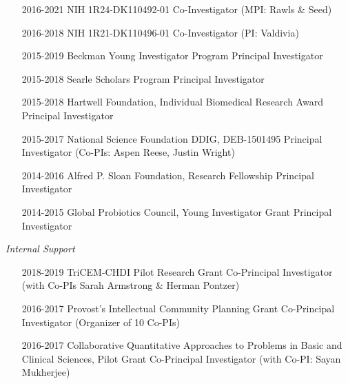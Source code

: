 \documentclass[overlapped,line,11pt]{res}
\begin{document}
\begin{resume}
\begin{itemize}[leftmargin=2cm, style=sameline]
\item[2016-2021] NIH 1R24-DK110492-01  \newline
  Co-Investigator (MPI: Rawls \& Seed)

\item[2016-2018] NIH 1R21-DK110496-01 \newline Co-Investigator (PI: Valdivia)

\item[2015-2019] Beckman Young Investigator Program
   \newline Principal Investigator

\item[2015-2018] Searle Scholars Program  \newline Principal Investigator 
  
\item[2015-2018] Hartwell Foundation, Individual Biomedical Research Award \newline Principal Investigator 


\item[2015-2017] National Science Foundation DDIG, DEB-1501495 \newline Principal Investigator (Co-PIs: Aspen Reese, Justin Wright) 


\item[2014-2016] Alfred P. Sloan Foundation, Research Fellowship \newline Principal Investigator 

\item[2014-2015] Global Probiotics Council, Young Investigator Grant  \newline Principal Investigator 

\end{itemize}

\emph{Internal Support}
\vspace{.1in}

\begin{itemize}[leftmargin=2cm, style=sameline]

\item[2018-2019] TriCEM-CHDI Pilot Research Grant
  \newline Co-Principal Investigator (with Co-PIs Sarah Armstrong \& Herman Pontzer) 

\item[2016-2017] Provost's Intellectual Community Planning Grant
  \newline Co-Principal Investigator (Organizer of 10
  Co-PIs) 

\item[2016-2017]  Collaborative Quantitative Approaches to Problems in Basic and Clinical Sciences, Pilot Grant
  \newline Co-Principal Investigator (with Co-PI:
  Sayan Mukherjee) 


\end{itemize}
\end{resume}
\end{document}
